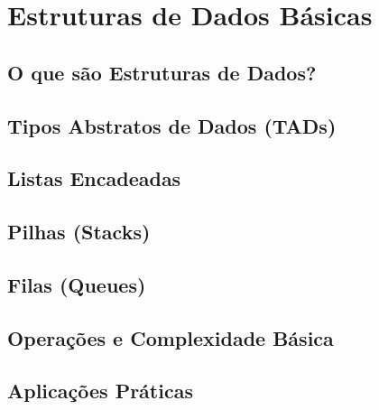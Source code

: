 \chapter{Estruturas de Dados Básicas}

\section{O que são Estruturas de Dados?}

\section{Tipos Abstratos de Dados (TADs)}

\section{Listas Encadeadas}

\section{Pilhas (Stacks)}

\section{Filas (Queues)}

\section{Operações e Complexidade Básica}

\section{Aplicações Práticas}
